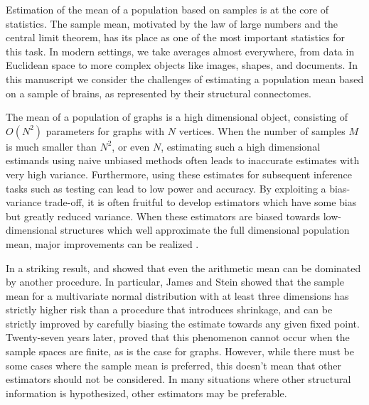 \documentclass[10pt,letterpaper]{article}
\begin{document}
Estimation of the mean of a population based on samples is at the core of statistics.
The sample mean, motivated by the law of large numbers and the central limit theorem, has its place as one of the most important statistics for this task.
In modern settings, we take averages almost everywhere, from data in Euclidean space to more complex objects like images, shapes, and documents.
In this manuscript we consider the challenges of estimating a population mean based on a sample of brains, as represented by their structural connectomes. 

The mean of a population of graphs is a high dimensional object, consisting of $O(N^2)$ parameters for graphs with $N$ vertices.
When the number of samples $M$ is much smaller than $N^2$, or even $N$, estimating such a high dimensional estimands using naive unbiased methods often leads to inaccurate estimates with very high variance.
Furthermore, using these estimates for subsequent inference tasks such as testing can lead to low power and accuracy.
By exploiting a bias-variance trade-off, it is often fruitful to develop estimators which have some bias but greatly reduced variance.
When these estimators are biased towards low-dimensional structures which well approximate the full dimensional population mean, major improvements can be realized \citep{trunk1979problem}.


In a striking result, \citet{stein1956inadmissibility} and \citet{james1961estimation} showed that even the arithmetic mean can be dominated by another procedure.
In particular, James and Stein showed that the sample mean for a multivariate normal distribution with at least three dimensions has strictly higher risk than a procedure that introduces shrinkage, and can be strictly improved by carefully biasing the  estimate towards any given fixed point. 
Twenty-seven years later, \citet{gutmann1982stein} proved that this phenomenon cannot occur when the sample spaces are finite, as is the case for graphs.
However, while there must be some cases where the sample mean is preferred, this doesn't mean that other estimators should not be considered.
In many situations where other structural information is hypothesized, other estimators may be preferable.
\end{document}
